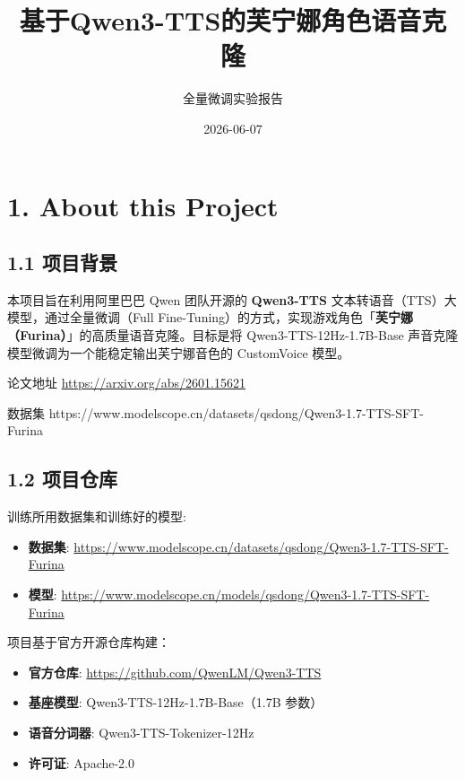 \documentclass[
  english,
  letterpaper,
  DIV=11,
  numbers=noendperiod]{scrartcl}
\title{基于Qwen3-TTS的芙宁娜角色语音克隆}
\subtitle{全量微调实验报告}
\author{}
\date{2026-06-07}
\providecommand{\tightlist}{%
  \setlength{\itemsep}{0pt}\setlength{\parskip}{0pt}}
\renewcommand*\contentsname{Table of contents}
\newcommand\contentsname{Table of contents}
\begin{document}
\maketitle

\renewcommand*\contentsname{Table of contents}
{
\setcounter{tocdepth}{3}
\tableofcontents
}

\section{1. About this Project}\label{sec-about}

\subsection{1.1 项目背景}\label{ux9879ux76eeux80ccux666f}

本项目旨在利用阿里巴巴 Qwen 团队开源的 \textbf{Qwen3-TTS}
文本转语音（TTS）大模型，通过全量微调（Full
Fine-Tuning）的方式，实现游戏角色「\textbf{芙宁娜（Furina）}」的高质量语音克隆。目标是将
Qwen3-TTS-12Hz-1.7B-Base 声音克隆模型微调为一个能稳定输出芙宁娜音色的
CustomVoice 模型。

论文地址 \url{https://arxiv.org/abs/2601.15621}

数据集
https://www.modelscope.cn/datasets/qsdong/Qwen3-1.7-TTS-SFT-Furina

\subsection{1.2 项目仓库}\label{ux9879ux76eeux4ed3ux5e93}

训练所用数据集和训练好的模型:

\begin{itemize}
\tightlist
\item
  \textbf{数据集}:
  \url{https://www.modelscope.cn/datasets/qsdong/Qwen3-1.7-TTS-SFT-Furina}
\item
  \textbf{模型}:
  \url{https://www.modelscope.cn/models/qsdong/Qwen3-1.7-TTS-SFT-Furina}
\end{itemize}

项目基于官方开源仓库构建：

\begin{itemize}
\tightlist
\item
  \textbf{官方仓库}: \url{https://github.com/QwenLM/Qwen3-TTS}
\item
  \textbf{基座模型}: Qwen3-TTS-12Hz-1.7B-Base（1.7B 参数）
\item
  \textbf{语音分词器}: Qwen3-TTS-Tokenizer-12Hz
\item
  \textbf{许可证}: Apache-2.0
\end{itemize}
\end{document}
